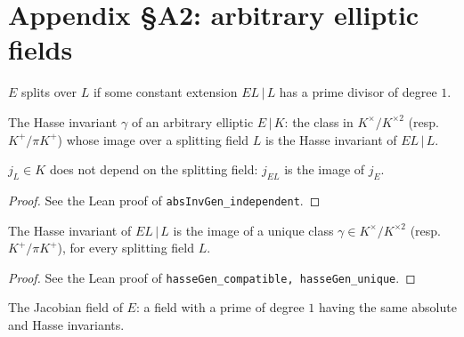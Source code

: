 \section{Appendix \S A2: arbitrary elliptic fields}

\begin{definition}
\label{def:splits-over}
\leanok
$E$ splits over $L$ if some constant extension $EL\,|\,L$ has a prime divisor of degree $1$.
\end{definition}

\begin{definition}
\label{def:hasse-general}
\leanok
The Hasse invariant $\gamma$ of an arbitrary elliptic $E\,|\,K$: the class in $K^\times/K^{\times2}$ (resp.\ $K^+/\pi K^+$) whose image over a splitting field $L$ is the Hasse invariant of $EL\,|\,L$.
\end{definition}

\begin{theorem}
\label{thm:A2-absinv}
\leanok
$j_L\in K$ does not depend on the splitting field: $j_{EL}$ is the image of $j_E$.
\end{theorem}
\begin{proof}
See the Lean proof of \texttt{absInvGen\_independent}.
\end{proof}

\begin{theorem}[Formula (51)]
\label{thm:A2-51}
\leanok
The Hasse invariant of $EL\,|\,L$ is the image of a unique class $\gamma\in K^\times/K^{\times2}$ (resp.\ $K^+/\pi K^+$), for every splitting field $L$.
\end{theorem}
\begin{proof}
See the Lean proof of \texttt{hasseGen\_compatible, hasseGen\_unique}.
\end{proof}

\begin{definition}
\label{def:jacobian-field}
\leanok
The Jacobian field of $E$: a field with a prime of degree $1$ having the same absolute and Hasse invariants.
\end{definition}

